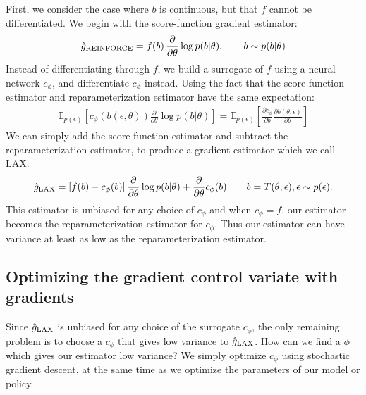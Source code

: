 \documentclass{article}
\newcommand{\E}{\mathbb{E}}
\newcommand{\PT}{\frac{\partial}{\partial \theta}}
\newcommand{\LP}[1]{\PT \log p(#1)}
\newcommand{\LAX}{{\textnormal{LAX}}}
\newcommand{\RELAX}{{\textnormal{RELAX}}}
\begin{document}
First, we consider the case where $b$ is continuous, but that $f$ cannot be differentiated.
We begin with the score-function gradient estimator:
%
\begin{align}
\hat g_\textnormal{REINFORCE} = f \! \left( b \right) \PT \log p(b | \theta), \qquad b \sim p(b|\theta)
\end{align}
%
Instead of differentiating through $f$, we build a surrogate of $f$ using a neural network $c_\phi$, and differentiate $c_\phi$ instead.
Using the fact that the score-function estimator and reparameterization estimator have the same expectation:
%
\begin{align}
\E_{p(\epsilon)} \left[ c_\phi ( b(\epsilon, \theta)) \PT \log p(b | \theta) \right] =
\E_{p(\epsilon)} \left[ \frac{\partial c_\phi}{\partial b} \frac{\partial b(\theta, \epsilon)}{\partial \theta} \right]
\end{align}
%
%
We can simply add the score-function estimator and subtract the reparameterization estimator, to produce a gradient estimator which we call LAX:
%
\begin{align}
\label{eq:cont_est}
\hat g_\LAX = \left[ f(b) -c_\phi(b) \right] \PT \log p(b|\theta) + \PT c_\phi(b) \qquad b = T(\theta, \epsilon), \epsilon \sim p(\epsilon).
\end{align}
%
This estimator is unbiased for any choice of $c_\phi$ and when $c_\phi = f$, our estimator becomes the reparameterization estimator for $c_\phi$. Thus our estimator can have variance at least as low as the reparameterization estimator. 


\subsection{Optimizing the gradient control variate with gradients}

Since $\hat g_\LAX$ is unbiased for any choice of the surrogate $c_\phi$, the only remaining problem is to choose a $c_\phi$ that gives low variance to $\hat g_\LAX$.
How can we find a $\phi$ which gives our estimator low variance?
We simply optimize $c_\phi$ using stochastic gradient descent, at the same time as we optimize the parameters of our model or policy.
\end{document}
